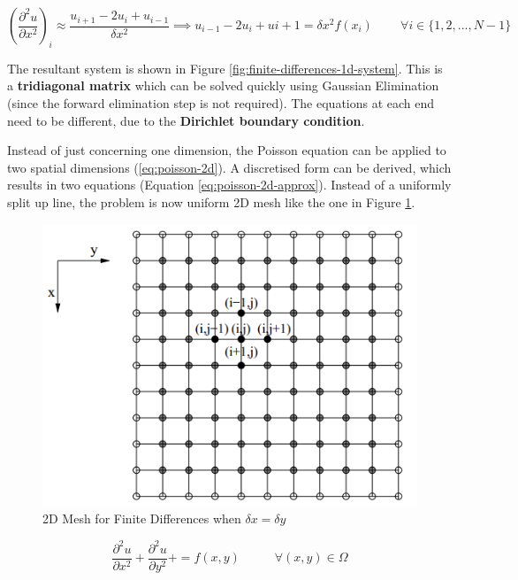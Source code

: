 \documentclass{article}
\begin{document}
\begin{equation}
	{\left( \frac{\partial^2 u}{\partial x^2}\right)}_i \approx \frac{u_{i+1} - 2u_i + u_{i - 1}}{\delta x^2}
	\implies
	u_{i - 1} - 2u_i + u{i + 1} = \delta x^2 f(x_i)
	\;\;\;\;\;\;\;\; \forall
	i \in \lbrace 1, 2, ..., N - 1 \rbrace
	\label{eq:finite-differences-1d-node}
\end{equation}

The resultant system is shown in Figure \ref{fig:finite-differences-1d-system}. This is a \textbf{tridiagonal matrix} which can be solved quickly using Gaussian Elimination (since the forward elimination step is not required). The equations at each end need to be different, due to the \textbf{Dirichlet boundary condition}.

Instead of just concerning one dimension, the Poisson equation can be applied to two spatial dimensions (\ref{eq:poisson-2d}). A discretised form can be derived, which results in two equations (Equation \ref{eq:poisson-2d-approx}). Instead of a uniformly split up line, the problem is now uniform 2D mesh like the one in Figure \ref{fig:2d-finite-differences-mesh}.

\begin{figure}
	\centering
	\includegraphics[scale=0.35]{figures/2d-finite-differences-mesh.png}
	\caption{2D Mesh for Finite Differences when $\delta x = \delta y$}
	\label{fig:2d-finite-differences-mesh}
\end{figure}

\begin{equation}
	\frac{\partial^2 u}{\partial x^2} + \frac{\partial^2 u}{\partial y^2} +  = f(x, y)
	\;\;\;\;\;\;\;\;\;\; \forall (x, y) \in \Omega
	\label{eq:poisson-2d}
\end{equation}
\end{document}
